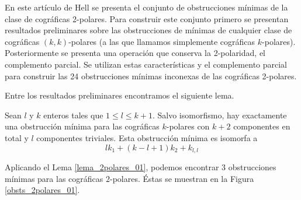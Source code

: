 En este artículo de Hell \cite{Hell03} se presenta el conjunto de obstrucciones mínimas de la clase de cográficas 2-polares. Para construir este conjunto primero se presentan resultados preliminares sobre las obstrucciones de mínimas de cualquier clase de cográficas $(k,k)$-polares (a las que llamamos simplemente cográficas $k$-polares). Posteriormente se presenta una operación que conserva la 2-polaridad, el complemento parcial. Se utilizan estas características y el complemento parcial para construir las 24 obstrucciones mínimas inconexas de las cográficas 2-polares. 

Entre los resultados preliminares encontramos el siguiente lema.

\begin{lemma}
\label{lema_2polares_01}
Sean $l$ y $k$ enteros tales que $1 \leq l \leq k+1$. Salvo isomorfismo, hay exactamente una obstrucción mínima para las cográficas $k$-polares con $k+2$ componentes en total y $l$ componentes triviales. Esta obstrucción mínima es isomorfa a 
$$lk_1+(k-l+1)k_2+k_{l,l}$$
\end{lemma}

Aplicando el Lema \ref{lema_2polares_01}, podemos encontrar 3 obstrucciones mínimas para las cográficas $2$-polares. Éstas se muestran en la Figura \ref{obsts_2polares_01}.

